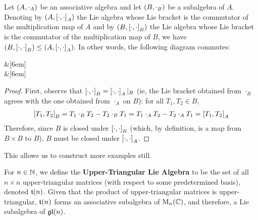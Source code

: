 \begin{boxproposition}\label{Ch1:Prop:Subalg_Commbracket}
    Let $\left( A, \cdot_A \right)$ be an associative algebra and let $\left( B, \cdot_B \right)$ be a subalgebra of $A$. Denoting by $\left( A, \left[ \cdot, \cdot \right]_A \right)$ the Lie algebra whose Lie bracket is the commutator of the multiplication map of $A$ and by $\left( B, \left[ \cdot, \cdot \right]_B \right)$ the Lie algebra whose Lie bracket is the commutator of the multiplication map of $B$, we have $\left( B, \left[ \cdot, \cdot \right]_B \right) \leq \left( A, \left[ \cdot, \cdot \right]_A \right)$. In other words, the following diagram commutes:

    \begin{cd}
        \arrow[r] &[6em]
         \\[2em]
        \arrow[r]
         &[6em]
        \label{Ch1:cd:Subalg_Commbracket}
    \end{cd}
\end{boxproposition}
\begin{proof}
    First, observe that $\left[ \cdot, \cdot \right]_B = \left[ \cdot, \cdot \right]_A\vert_B$ (ie, the Lie bracket obtained from $\cdot_B$ agrees with the one obtained from $\cdot_A$ on $B$): for all $T_1, T_2 \in B$,
    \begin{align*}
        \left[ T_1, T_2 \right]_B = T_1 \cdot_B T_2 - T_2 \cdot_B T_1 = T_1 \cdot_A T_2 - T_2 \cdot_A T_1 = \left[ T_1, T_2 \right]_A
    \end{align*}
    Therefore, since $B$ is closed under $\left[ \cdot, \cdot \right]_B$ (which, by definition, is a map from $B \times B$ to $B$), $B$ must be closed under $\left[ \cdot, \cdot \right]_A$.
\end{proof}

This allows us to construct more examples still.

\begin{boxexample}\label{Ch1:Eg:UpperTriangularLieAlg}
    For $n \in \mathbb{N}$, we define the \textbf{Upper-Triangular Lie Algebra} to be the set of all $n \times n$ upper-triangular matrices (with respect to some predetermined basis), denoted $\mathfrak{t}\!\left( n \right)$. Given that the product of upper-triangular matrices is upper-triangular, $\mathfrak{t}\!\left( n \right)$ forms an associative subalgebra of $\operatorname{M}_{n}\!\left( \mathbb{C} \right)$, and therefore, a Lie subalgebra of $\mathfrak{gl}\!\left( n \right)$.
\end{boxexample}

